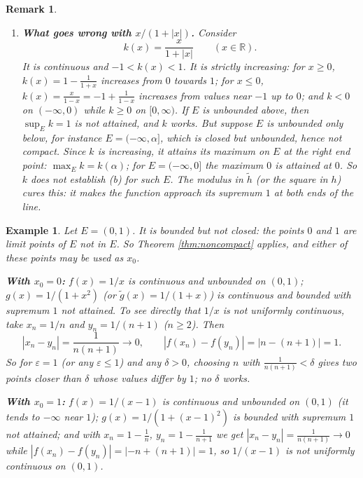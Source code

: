 \documentclass{article}
\theoremstyle{mythm}
\newtheorem{remark}[theorem]{Remark}
\newtheorem{example}[theorem]{Example}
\begin{document}
\begin{remark}
\begin{enumerate}
    \item \textbf{What goes wrong with $x/(1+|x|)$.} Consider
    \[
    k(x) = \frac{x}{1 + |x|} \qquad (x \in \mathbb{R}).
    \]
    It is continuous and $-1 < k(x) < 1$. It is strictly increasing: for $x \geq 0$, $k(x) = 1 - \frac{1}{1+x}$ increases from $0$ towards $1$; for $x \leq 0$, $k(x) = \frac{x}{1-x} = -1 + \frac{1}{1-x}$ increases from values near $-1$ up to $0$; and $k < 0$ on $(-\infty,0)$ while $k \geq 0$ on $[0,\infty)$. If $E$ is unbounded \textit{above}, then $\sup_E k = 1$ is not attained, and $k$ works. But suppose $E$ is unbounded only \textit{below}, for instance $E = (-\infty, \alpha]$, which is closed but unbounded, hence not compact. Since $k$ is increasing, it attains its maximum on $E$ at the right end point: $\max_E k = k(\alpha)$; for $E = (-\infty, 0]$ the maximum $0$ is attained at $0$. So $k$ does \textit{not} establish (b) for such $E$. The modulus in $\tilde h$ (or the square in $h$) cures this: it makes the function approach its supremum $1$ at \textit{both} ends of the line.
\end{enumerate}
\end{remark}

\begin{example}\label{ex:01}
Let $E = (0,1)$. It is bounded but not closed: the points $0$ and $1$ are limit points of $E$ not in $E$. So Theorem \ref{thm:noncompact} applies, and either of these points may be used as $x_0$.

\textbf{With $x_0 = 0$:} $f(x) = 1/x$ is continuous and unbounded on $(0,1)$; $g(x) = 1/(1+x^2)$ (or $\tilde g(x) = 1/(1+x)$) is continuous and bounded with supremum $1$ not attained. To see directly that $1/x$ is not uniformly continuous, take $x_n = 1/n$ and $y_n = 1/(n+1)$ ($n \geq 2$). Then
\[
|x_n - y_n| = \frac{1}{n(n+1)} \to 0, \qquad |f(x_n) - f(y_n)| = |n - (n+1)| = 1.
\]
So for $\varepsilon = 1$ (or any $\varepsilon \leq 1$) and any $\delta > 0$, choosing $n$ with $\frac{1}{n(n+1)} < \delta$ gives two points closer than $\delta$ whose values differ by $1$; no $\delta$ works.

\textbf{With $x_0 = 1$:} $f(x) = 1/(x-1)$ is continuous and unbounded on $(0,1)$ (it tends to $-\infty$ near $1$); $g(x) = 1/(1 + (x-1)^2)$ is bounded with supremum $1$ not attained; and with $x_n = 1 - \frac{1}{n}$, $y_n = 1 - \frac{1}{n+1}$ we get $|x_n - y_n| = \frac{1}{n(n+1)} \to 0$ while $|f(x_n) - f(y_n)| = |-n + (n+1)| = 1$, so $1/(x-1)$ is not uniformly continuous on $(0,1)$.
\end{example}
\end{document}
